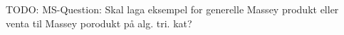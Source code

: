 TODO: MS-Question: Skal laga eksempel for generelle Massey produkt eller venta til Massey porodukt på alg. tri. kat?